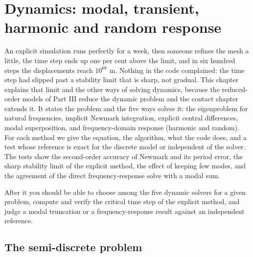 \chapter{Dynamics: modal, transient, harmonic and random response}\label{ch:dyn}

\begin{tcolorbox}[colback=gray!5,colframe=gray!50,title={In this chapter}]
An explicit simulation runs perfectly for a week, then someone refines the mesh a little, the time step ends up one per cent above the limit, and in six hundred steps the displacements reach $10^{68}$ m. Nothing in the code complained: the time step had slipped past a stability limit that is sharp, not gradual. This chapter explains that limit and the other ways of solving dynamics, because the reduced-order models of Part III reduce the dynamic problem and the contact chapter extends it. It states the problem and the five ways \fea{} solves it: the eigenproblem for natural frequencies, implicit Newmark integration, explicit central differences, modal superposition, and frequency-domain response (harmonic and random). For each method we give the equation, the algorithm, what the code does, and a test whose reference is exact for the discrete model or independent of the solver. The tests show the second-order accuracy of Newmark and its period error, the sharp stability limit of the explicit method, the effect of keeping few modes, and the agreement of the direct frequency-response solve with a modal sum.\par\smallskip
After it you should be able to choose among the five dynamic solvers for a given problem, compute and verify the critical time step of the explicit method, and judge a modal truncation or a frequency-response result against an independent reference.
\end{tcolorbox}

\section{The semi-discrete problem}\label{sec:dy-problem}

